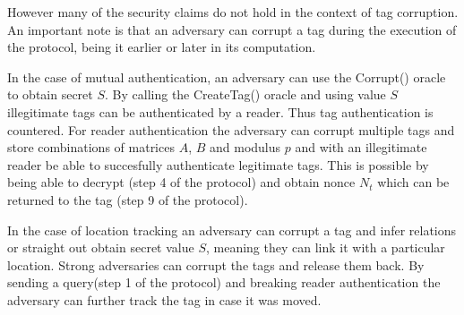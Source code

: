     However many of the security claims do not hold in the context of tag corruption. An important note is that an adversary can corrupt
    a tag during the execution of the protocol, being it earlier or later in its computation.

    In the case of mutual authentication, an adversary can use the Corrupt() oracle to obtain secret $S$. By calling the CreateTag()
    oracle and using value $S$ illegitimate tags can be authenticated by a reader. Thus tag authentication is countered.
    For reader authentication the adversary can corrupt
    multiple tags and store combinations of matrices $A$, $B$ and modulus $p$ and with an illegitimate reader be able to succesfully
    authenticate legitimate tags. This is possible by being able to decrypt (step 4 of the protocol) and obtain nonce $N_t$ which can
    be returned to the tag (step 9 of the protocol).
    
    In the case of location tracking an adversary can corrupt a tag and infer relations or straight out obtain secret value $S$, meaning
    they can link it with a particular location. Strong adversaries can corrupt the tags and release them back. By sending a query(step 1
    of the protocol) and breaking reader authentication the adversary can further track the tag in case it was moved.

